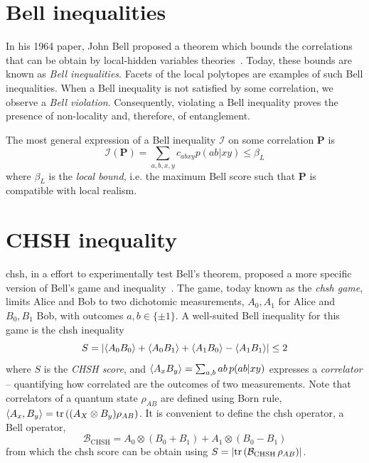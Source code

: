 \section{Bell inequalities}

In his 1964 paper, John Bell proposed a theorem which bounds the correlations that can be obtain by local-hidden variables theories~\cite{Bell1964}.
Today, these bounds are known as \textit{Bell inequalities}.
Facets of the local polytopes are examples of such Bell inequalities.
When a Bell inequality is not satisfied by some correlation, we observe a \textit{Bell violation}.
Consequently, violating a Bell inequality proves the presence of non-locality and, therefore, of entanglement.

\medbreak

The most general expression of a Bell inequality $\mathcal{I}$ on some correlation $\mathbf{P}$ is
\begin{equation}
	\mathcal{I}(\mathbf{P}) = \sum_{a,b,x,y}c_{abxy} p(ab|xy) \leq \beta_L
	\label{eq:bell_inequality}
\end{equation}
where $\beta_L$ is the \textit{local bound}, i.e. the maximum Bell score such that $\mathbf{P}$ is compatible with local realism.

\section{CHSH inequality}

\acrfull{chsh}, in a effort to experimentally test Bell's theorem, proposed a more specific version of Bell's game and inequality~\cite{Clauser1969}.
The game, today known as the \textit{\acrshort{chsh} game}, limits Alice and Bob to two dichotomic measurements, $A_0,A_1$ for Alice and $B_0,B_1$ Bob, with outcomes $a,b\in\{\pm 1\}$. 
A well-suited Bell inequality for this game is the \acrshort{chsh} inequality 
\begin{equation}
	S = \left | \langle {A_0 B_0} \rangle + \langle {A_0 B_1} \rangle + \langle {A_1 B_0} \rangle - \langle {A_1 B_1} \rangle  \right | \leq 2
	\label{eq:CHSH}
\end{equation}
where $S$ is the \textit{CHSH score}, and $\langle {A_x B_y} \rangle = \sum_{a,b} ab\,p(ab|xy)$ expresses a \textit{correlator} -- quantifying how correlated are the outcomes of two measurements.
Note that correlators of a quantum state $\rho_{AB}$ are defined using Born rule, $\mean{A_x,B_y} = \trr{(A_X \otimes B_y)\rho_{AB}}$.
It is convenient to define the \acrshort{chsh} operator, a Bell operator,
\begin{equation}
	\mathcal{B}_{\mathrm{CHSH}} = A_0 \otimes \left( B_0 + B_1 \right) + A_1 \otimes \left( B_0 - B_1 \right)
	\label{eq:CHSH_operator}
\end{equation}
from which the \acrshort{chsh} score can be obtain using $S = \left| \trr{\mathcal{B}_\mathrm{CHSH}\, \rho_{AB} } \right|$.

